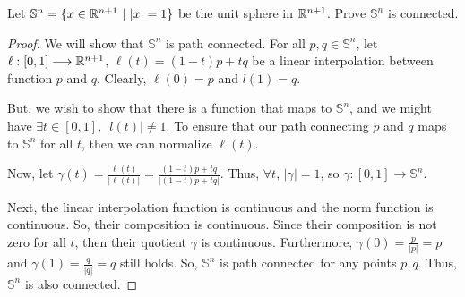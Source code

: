 \documentclass[../hw3]{subfiles}
\begin{document}
\begin{problem}[3]
Let $\mathbb{S}^{n}=\{x\in \mathbb{R}^{n+1}\ |\ |x| = 1\} $ be the unit sphere in $\mathbb{R}^{n+1}$. Prove $\mathbb{S}^{n}$ is connected.
\end{problem}
\begin{proof}
	We will show that $\mathbb{S}^{n}$ is path connected. For all $p,q\in \mathbb{S}^{n}$, let $\ell:[0,1]\longrightarrow\mathbb{R}^{n+1}$, $\ell(t)=(1-t)p+tq$ be a linear interpolation between function $p$ and $q$. Clearly, $\ell(0)=p$ and $l(1)=q$.

	But, we wish to show that there is a function that maps to $\mathbb{S}^{n}$, and we might have $\exists t\in [0,1],\ |l(t)|\neq 1$. To ensure that our path connecting  $p$ and  $q$ maps to  $\mathbb{S}^{n}$ for all $t$, then we can normalize  $\ell(t)$.

	Now, let  $\gamma(t)=\frac{\ell(t)}{|\ell(t)|}=\frac{(1-t)p+tq}{|(1-t)p+tq|}$. Thus, $\forall t,\, |\gamma| =1$, so $\gamma:[0,1]\longrightarrow\mathbb{S}^{n}$.

	Next, the linear interpolation function is continuous and the norm function is continuous. So, their composition is continuous. Since their composition is not zero for all  $t$, then their quotient $\gamma$ is continuous. Furthermore, $\gamma(0)=\frac{p}{|p|}=p$ and $\gamma(1)=\frac{q}{|q|}=q$ still holds. So, $\mathbb{S}^{n}$ is path connected for any points $p,q$. Thus, $\mathbb{S}^{n}$ is also connected.
\end{proof}
\end{document}
